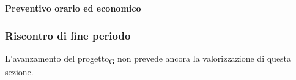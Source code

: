 \paragraph{Preventivo orario ed economico}
\subparagraph*{}

\contabilitaTable{
	
}

\subsubsection{Riscontro di fine periodo}


L'avanzamento del progetto\textsubscript{G} non prevede ancora la valorizzazione di questa sezione.